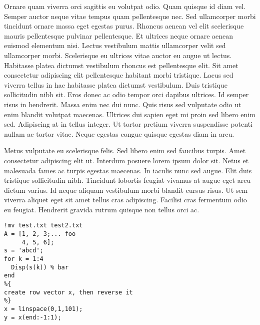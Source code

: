\documentclass[portuguese, 11pt, a4paper,titlepage, oneside]{article}
\begin{document}
Ornare quam viverra orci sagittis eu volutpat odio. Quam quisque id diam vel. Semper auctor neque vitae tempus quam pellentesque nec. Sed ullamcorper morbi tincidunt ornare massa eget egestas purus. Rhoncus aenean vel elit scelerisque mauris pellentesque pulvinar pellentesque. Et ultrices neque ornare aenean euismod elementum nisi. Lectus vestibulum mattis ullamcorper velit sed ullamcorper morbi. Scelerisque eu ultrices vitae auctor eu augue ut lectus. Habitasse platea dictumst vestibulum rhoncus est pellentesque elit. Sit amet consectetur adipiscing elit pellentesque habitant morbi tristique. Lacus sed viverra tellus in hac habitasse platea dictumst vestibulum. Duis tristique sollicitudin nibh sit. Eros donec ac odio tempor orci dapibus ultrices. Id semper risus in hendrerit. Massa enim nec dui nunc. Quis risus sed vulputate odio ut enim blandit volutpat maecenas. Ultrices dui sapien eget mi proin sed libero enim sed. Adipiscing at in tellus integer. Ut tortor pretium viverra suspendisse potenti nullam ac tortor vitae. Neque egestas congue quisque egestas diam in arcu.

Metus vulputate eu scelerisque felis. Sed libero enim sed faucibus turpis. Amet consectetur adipiscing elit ut. Interdum posuere lorem ipsum dolor sit. Netus et malesuada fames ac turpis egestas maecenas. In iaculis nunc sed augue. Elit duis tristique sollicitudin nibh. Tincidunt lobortis feugiat vivamus at augue eget arcu dictum varius. Id neque aliquam vestibulum morbi blandit cursus risus. Ut sem viverra aliquet eget sit amet tellus cras adipiscing. Facilisi cras fermentum odio eu feugiat. Hendrerit gravida rutrum quisque non tellus orci ac.

\begin{lstlisting}[style=Matlab-editor]
%% Sample Matlab code
!mv test.txt test2.txt
A = [1, 2, 3;... foo
     4, 5, 6];
s = 'abcd';
for k = 1:4
  Disp(s(k)) % bar
end
%{
create row vector x, then reverse it
%}
x = linspace(0,1,101);
y = x(end:-1:1);
\end{lstlisting}
\end{document}
